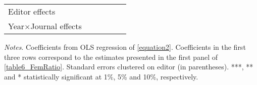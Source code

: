 \begin{table}
\begin{threeparttable}
\begin{tabular}{p{3cm}S@{}S@{}S@{}S@{}S@{}}
            \midrule
            Editor effects       &           {}   &           {}   &           {}   &           {}   &           {}   \\
            Year\(\times\)Journal effects          &           {}   &           {}   &           {}   &           {}   &           {}   \\
            \bottomrule
        \end{tabular}
        \begin{tablenotes}
            \tiny
            \item \textit{Notes}. Coefficients from OLS regression of \autoref{equation2}. Coefficients in the first three rows correspond to the estimates presented in the first panel of \autoref{table6_FemRatio}. Standard errors clustered on editor (in parentheses). ***, ** and * statistically significant at 1\%, 5\% and 10\%, respectively.
        \end{tablenotes}
    \end{threeparttable}
\end{table}